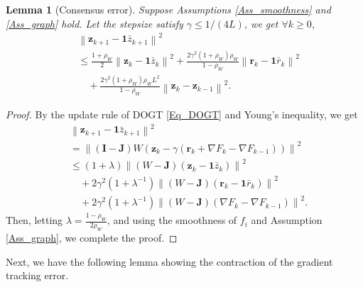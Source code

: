 \documentclass[letterpaper, 10 pt, conference]{ieeeconf}
\newtheorem{Lem}{Lemma}
\begin{document}
\begin{Lem}[Consensus error]\label{Lem_cons}
Suppose Assumptions \ref{Ass_smoothness} and \ref{Ass_graph} hold. Let the stepsize satisfy $\gamma \leqslant 1/\left( 4L \right) $, we get $\forall k \geqslant 0$,
\begin{equation}\label{Eq_consensus}
\begin{aligned}
&\left\| \mathbf{z}_{k+1}-\mathbf{1}\bar{z}_{k+1} \right\| ^2
\\
&\leqslant \frac{1+\rho _W}{2}\left\| \mathbf{z}_k-\mathbf{1}\bar{z}_k \right\| ^2+\frac{2\gamma ^2\left( 1+\rho _W \right) \rho _W}{1-\rho _W}\left\| \mathbf{r}_k-\mathbf{1}\bar{r}_k \right\| ^2
\\
&\quad+\frac{2\gamma ^2\left( 1+\rho _W \right) \rho _WL^2}{1-\rho _W}\left\| \mathbf{z}_k-\mathbf{z}_{k-1} \right\| ^2.
\end{aligned}
\end{equation}
\end{Lem}

\begin{proof}
By the update rule of DOGT \eqref{Eq_DOGT} and Young's inequality, we get
\begin{equation*}
\begin{aligned}
&\left\| \mathbf{z}_{k+1}-\mathbf{1}\bar{z}_{k+1} \right\| ^2
\\
&=\left\| \left( \mathbf{I}-\mathbf{J} \right) W\left( \mathbf{z}_k-\gamma \left( \mathbf{r}_k+\nabla F_k-\nabla F_{k-1} \right) \right) \right\| ^2
\\
&\leqslant \left( 1+\lambda \right) \left\| \left( W-\mathbf{J} \right) \left( \mathbf{z}_k-\mathbf{1}\bar{z}_k \right) \right\| ^2
\\
&\quad +2\gamma ^2\left( 1+\lambda ^{-1} \right) \left\| \left( W-\mathbf{J} \right) \left( \mathbf{r}_k-\mathbf{1}\bar{r}_k \right) \right\| ^2
\\
&\quad+2\gamma ^2\left( 1+\lambda ^{-1} \right) \left\| \left( W-\mathbf{J} \right) \left( \nabla F_k-\nabla F_{k-1} \right) \right\| ^2.
\end{aligned}
\end{equation*}
Then, letting $\lambda =\frac{1-\rho _W}{2\rho _W}$, and using the smoothness of $f_i$ and Assumption \ref{Ass_graph}, we complete the proof.
\end{proof}


Next, we have the following lemma showing the contraction of the gradient tracking error.
\end{document}
